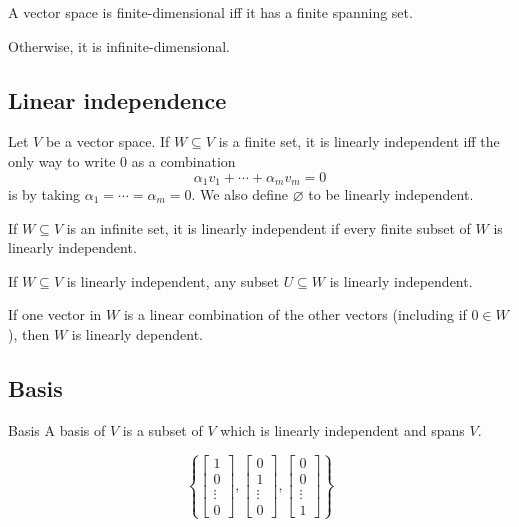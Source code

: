 \begin{definition}
  A vector space is finite-dimensional iff it has a finite spanning set.

  Otherwise, it is infinite-dimensional.
\end{definition}

\subsection{Linear independence}

\begin{definition}
  Let $V$ be a vector space. If $W \subseteq V$ is a finite set, it is linearly independent iff the only way to write 0 as a combination
  \[
    \alpha_1 v_1 + \cdots + \alpha_m v_m = 0
  \]
  is by taking $\alpha_1 = \cdots = \alpha_m = 0$. We also define $\varnothing$ to be linearly independent.

  If $W \subseteq V$ is an infinite set, it is linearly independent if every finite subset of $W$ is linearly independent.
\end{definition}

\begin{theorem}
  If $W \subseteq V$ is linearly independent, any subset $U \subseteq W$ is linearly independent.

  If one vector in $W$ is a linear combination of the other vectors (including if $0 \in W$), then $W$ is linearly dependent.
\end{theorem}
  
\subsection{Basis}

\begin{definition}{Basis}
  A basis of $V$ is a subset of $V$ which is linearly independent and spans $V$.
\end{definition}

\begin{definition}
  \[
    \left\{
      \begin{bmatrix}
        1 \\
        0 \\ 
        \vdots \\
        0
      \end{bmatrix},
      \begin{bmatrix}
        0 \\
        1 \\ 
        \vdots \\
        0
      \end{bmatrix},
      \begin{bmatrix}
        0 \\
        0 \\ 
        \vdots \\
        1
      \end{bmatrix}
    \right\}
  \]
\end{definition}

